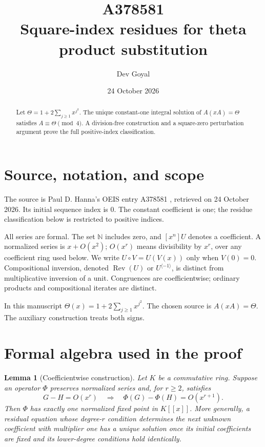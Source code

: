 \documentclass[11pt,a4paper]{article}
\title{A378581\\[4pt]\large Square-index residues for theta product substitution}
\author{Dev Goyal}
\date{24 October 2026}
\newtheorem{lemma}[theorem]{Lemma}
\theoremstyle{remark}
\newcommand{\N}{\mathbb N}
\newcommand{\ps}[1]{#1[[x]]}
\newcommand{\Rev}{\operatorname{Rev}}
\newcommand{\rev}{^{\langle-1\rangle}}
\begin{document}
\maketitle
\begin{center}
\end{center}
\begin{abstract}
Let $\Theta=1+2\sum_{j\ge1}x^{j^2}$. The unique constant-one integral solution of $A(xA)=\Theta$ satisfies $A\equiv\Theta\pmod4$. A division-free construction and a square-zero perturbation argument prove the full positive-index classification.
\end{abstract}

\section{Source, notation, and scope}

The source is Paul D. Hanna's OEIS entry A378581 \cite{oeis581},
retrieved on 24 October 2026. Its initial sequence index is 0.
The constant coefficient is one; the residue classification below
is restricted to positive indices.

All series are formal. The set $\N$ includes zero, and $[x^n]U$ denotes a
coefficient. A normalized series is $x+O(x^2)$; $O(x^r)$ means divisibility
by $x^r$, over any coefficient ring used below. We write $U\circ V=U(V(x))$
only when $V(0)=0$. Compositional inversion, denoted $\Rev(U)$ or $U\rev$,
is distinct from multiplicative inversion of a unit. Congruences are
coefficientwise; ordinary products and compositional iterates are distinct.

In this manuscript $\Theta(x)=1+2\sum_{j\ge1}x^{j^2}$. The chosen source is
$A(xA)=\Theta$. The auxiliary construction treats both signs.

\section{Formal algebra used in the proof}

\begin{lemma}[Coefficientwise construction]\label{lem:contraction}
Let $K$ be a commutative ring. Suppose an operator $\Phi$ preserves
normalized series and, for $r\ge2$, satisfies
\[
 G-H=O(x^r)\quad\Longrightarrow\quad
 \Phi(G)-\Phi(H)=O(x^{r+1}).
\]
Then $\Phi$ has exactly one normalized fixed point in $\ps K$.
More generally, a residual equation whose degree-$r$ condition determines
the next unknown coefficient with multiplier one has a unique solution
once its initial coefficients are fixed and its lower-degree conditions
hold identically.
\end{lemma}
\end{document}

